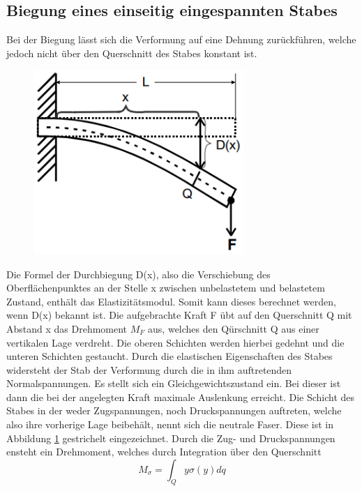 \subsection{Biegung eines einseitig eingespannten Stabes}
Bei der Biegung lässt sich die Verformung auf eine Dehnung zurückführen, welche jedoch nicht über den Querschnitt des Stabes konstant ist. 
\begin{figure}[H]
    \centering
    \captionsetup{justification=centering}
    \includegraphics[height=7cm]{"Einseitig_Biegung.png"}
    \label{Fig:Einseitig}
\end{figure}
Die Formel der Durchbiegung D(x), also die Verschiebung des Oberflächenpunktes an der Stelle x zwischen unbelastetem und belastetem Zustand, enthält das Elastizitätsmodul. Somit kann dieses berechnet werden, wenn D(x) bekannt ist. Die aufgebrachte Kraft F übt auf den Querschnitt Q mit Abstand x das Drehmoment $M_F$ aus, welches den Qürschnitt Q aus einer vertikalen Lage verdreht. Die oberen Schichten werden hierbei gedehnt und die unteren Schichten gestaucht. Durch die elastischen Eigenschaften des Stabes widersteht der Stab der Verformung durch die in ihm auftretenden Normalspannungen. Es stellt sich ein Gleichgewichtszustand ein. Bei dieser ist dann die bei der angelegten Kraft maximale Auslenkung erreicht. Die Schicht des Stabes in der weder Zugspannungen, noch Druckspannungen auftreten, welche also ihre vorherige Lage beibehält, nennt sich die neutrale Faser. Diese ist in Abbildung \ref{Fig:Einseitig} gestrichelt eingezeichnet.
Durch die Zug- und Druckspannungen ensteht ein Drehmoment, welches durch Integration über den Querschnitt 
\begin{equation}
    M_{\sigma}=\int_Qy\sigma(y)dq
\end{equation}
